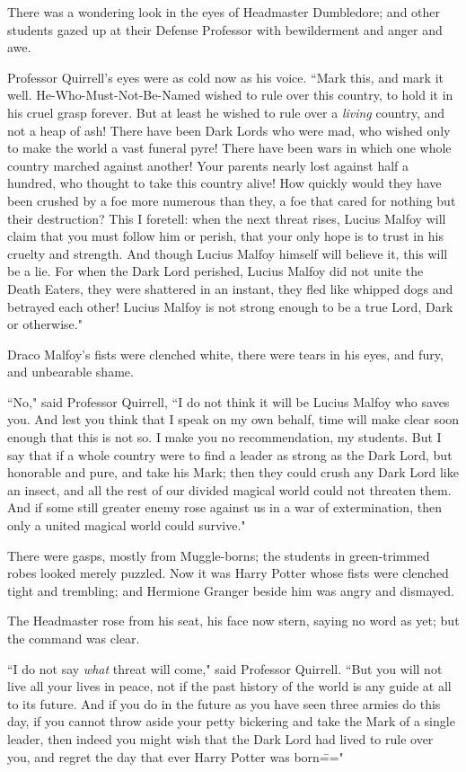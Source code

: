 There was a wondering look in the eyes of Headmaster Dumbledore; and other students gazed up at their Defense Professor with bewilderment and anger and awe.

Professor Quirrell's eyes were as cold now as his voice. ``Mark this, and mark it well. He-Who-Must-Not-Be-Named wished to rule over this country, to hold it in his cruel grasp forever. But at least he wished to rule over a \emph{living} country, and not a heap of ash! There have been Dark Lords who were mad, who wished only to make the world a vast funeral pyre! There have been wars in which one whole country marched against another! Your parents nearly lost against half a hundred, who thought to take this country alive! How quickly would they have been crushed by a foe more numerous than they, a foe that cared for nothing but their destruction? This I foretell: when the next threat rises, Lucius Malfoy will claim that you must follow him or perish, that your only hope is to trust in his cruelty and strength. And though Lucius Malfoy himself will believe it, this will be a lie. For when the Dark Lord perished, Lucius Malfoy did not unite the Death Eaters, they were shattered in an instant, they fled like whipped dogs and betrayed each other! Lucius Malfoy is not strong enough to be a true Lord, Dark or otherwise."

Draco Malfoy's fists were clenched white, there were tears in his eyes, and fury, and unbearable shame.

``No," said Professor Quirrell, ``I do not think it will be Lucius Malfoy who saves you. And lest you think that I speak on my own behalf, time will make clear soon enough that this is not so. I make you no recommendation, my students. But I say that if a whole country were to find a leader as strong as the Dark Lord, but honorable and pure, and take his Mark; then they could crush any Dark Lord like an insect, and all the rest of our divided magical world could not threaten them. And if some still greater enemy rose against us in a war of extermination, then only a united magical world could survive."

There were gasps, mostly from Muggle-borns; the students in green-trimmed robes looked merely puzzled. Now it was Harry Potter whose fists were clenched tight and trembling; and Hermione Granger beside him was angry and dismayed.

The Headmaster rose from his seat, his face now stern, saying no word as yet; but the command was clear.

``I do not say \emph{what} threat will come," said Professor Quirrell. ``But you will not live all your lives in peace, not if the past history of the world is any guide at all to its future. And if you do in the future as you have seen three armies do this day, if you cannot throw aside your petty bickering and take the Mark of a single leader, then indeed you might wish that the Dark Lord had lived to rule over you, and regret the day that ever Harry Potter was born\==="

